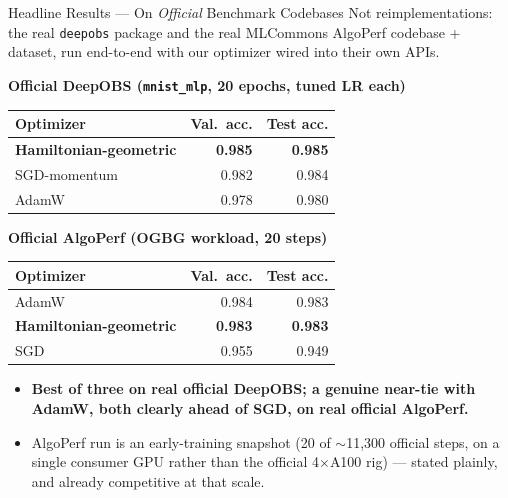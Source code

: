 \documentclass[aspectratio=169,11pt]{beamer}
\begin{document}
\begin{frame}{Headline Results --- On \emph{Official} Benchmark Codebases}
  \small
  Not reimplementations: the real \texttt{deepobs} package and the real MLCommons AlgoPerf
  codebase + dataset, run end-to-end with our optimizer wired into their own APIs.
  \vspace{0.3em}

  \scriptsize
  \textbf{Official DeepOBS (\texttt{mnist\_mlp}, 20 epochs, tuned LR each)}
  \begin{tabular}{@{}lrr@{}}
    \toprule
    Optimizer & Val.\ acc. & Test acc. \\
    \midrule
    \textbf{Hamiltonian-geometric} & \textbf{0.985} & \textbf{0.985} \\
    SGD-momentum & 0.982 & 0.984 \\
    AdamW & 0.978 & 0.980 \\
    \bottomrule
  \end{tabular}
  \hspace{1em}
  \textbf{Official AlgoPerf (OGBG workload, 20 steps)}
  \begin{tabular}{@{}lrr@{}}
    \toprule
    Optimizer & Val.\ acc. & Test acc. \\
    \midrule
    AdamW & 0.984 & 0.983 \\
    \textbf{Hamiltonian-geometric} & \textbf{0.983} & \textbf{0.983} \\
    SGD & 0.955 & 0.949 \\
    \bottomrule
  \end{tabular}

  \vspace{0.6em}
  \begin{itemize}
    \item \textbf{Best of three on real official DeepOBS; a genuine near-tie with AdamW, both
      clearly ahead of SGD, on real official AlgoPerf.}
    \item AlgoPerf run is an early-training snapshot (20 of $\sim$11{,}300 official steps, on a
      single consumer GPU rather than the official 4$\times$A100 rig) --- stated plainly, and
      already competitive at that scale.
  \end{itemize}
\end{frame}
\end{document}

